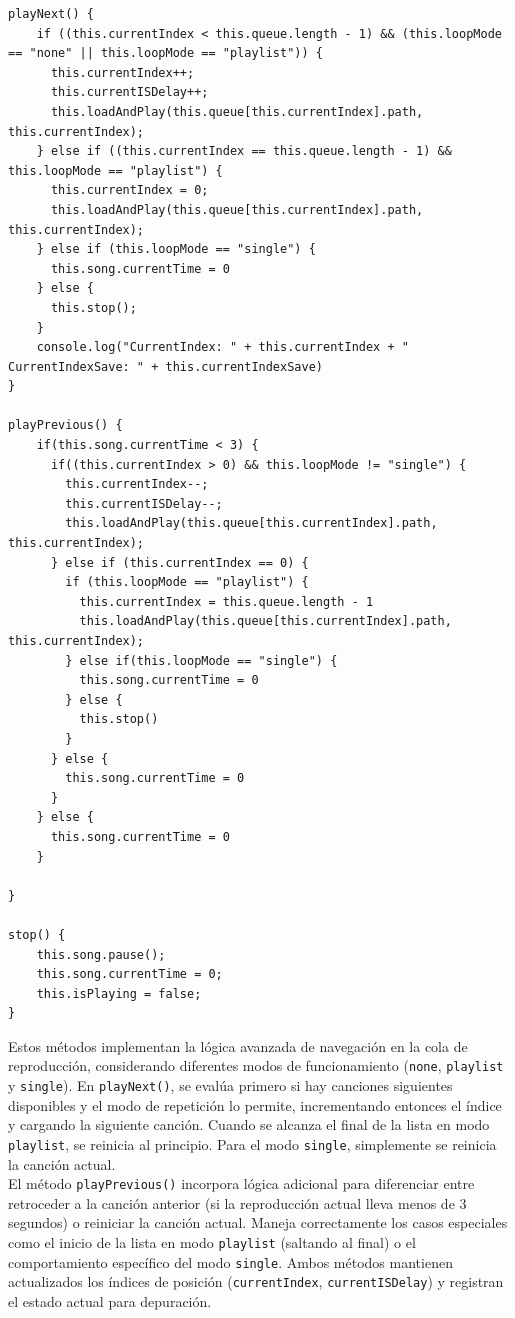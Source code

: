 \documentclass[11pt, a4paper]{article}
\begin{document}
                \begin{lstlisting}[caption={playNext() y playPrevious()}]
playNext() {
    if ((this.currentIndex < this.queue.length - 1) && (this.loopMode == "none" || this.loopMode == "playlist")) {
      this.currentIndex++;
      this.currentISDelay++;
      this.loadAndPlay(this.queue[this.currentIndex].path, this.currentIndex);
    } else if ((this.currentIndex == this.queue.length - 1) && this.loopMode == "playlist") {
      this.currentIndex = 0;
      this.loadAndPlay(this.queue[this.currentIndex].path, this.currentIndex);
    } else if (this.loopMode == "single") {
      this.song.currentTime = 0
    } else {
      this.stop();
    }
    console.log("CurrentIndex: " + this.currentIndex + " CurrentIndexSave: " + this.currentIndexSave)
}

playPrevious() {
    if(this.song.currentTime < 3) {
      if((this.currentIndex > 0) && this.loopMode != "single") {
        this.currentIndex--;
        this.currentISDelay--;
        this.loadAndPlay(this.queue[this.currentIndex].path, this.currentIndex);
      } else if (this.currentIndex == 0) {
        if (this.loopMode == "playlist") {
          this.currentIndex = this.queue.length - 1
          this.loadAndPlay(this.queue[this.currentIndex].path, this.currentIndex);
        } else if(this.loopMode == "single") {
          this.song.currentTime = 0
        } else {
          this.stop()
        }
      } else {
        this.song.currentTime = 0
      }
    } else {
      this.song.currentTime = 0
    }
    
}

stop() {
    this.song.pause();
    this.song.currentTime = 0;
    this.isPlaying = false;
}
                \end{lstlisting}

                Estos métodos implementan la lógica avanzada de navegación en la cola de reproducción, considerando diferentes modos de funcionamiento (\texttt{none}, \texttt{playlist} y \texttt{single}). En \texttt{playNext()}, se evalúa primero si hay canciones siguientes disponibles y el modo de repetición lo permite, incrementando entonces el índice y cargando la siguiente canción. Cuando se alcanza el final de la lista en modo \texttt{playlist}, se reinicia al principio. Para el modo \texttt{single}, simplemente se reinicia la canción actual. \\

                El método \texttt{playPrevious()} incorpora lógica adicional para diferenciar entre retroceder a la canción anterior (si la reproducción actual lleva menos de 3 segundos) o reiniciar la canción actual. Maneja correctamente los casos especiales como el inicio de la lista en modo \texttt{playlist} (saltando al final) o el comportamiento específico del modo \texttt{single}. Ambos métodos mantienen actualizados los índices de posición (\texttt{currentIndex}, \texttt{currentISDelay}) y registran el estado actual para depuración. \\
\end{document}
